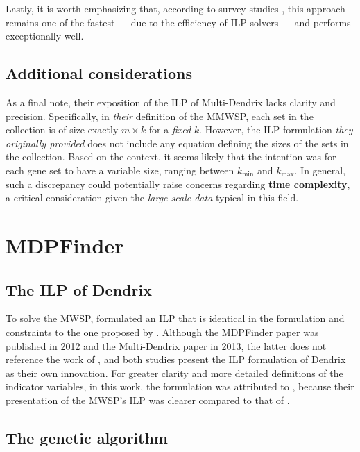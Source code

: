 Lastly, it is worth emphasizing that, according to survey studies \cite{survey}, this approach remains one of the fastest --- due to the efficiency of ILP solvers --- and performs exceptionally well.

\subsection{Additional considerations}

As a final note, their exposition of the ILP of Multi-Dendrix lacks clarity and precision. Specifically, in \textit{their} definition of the MMWSP, each set in the collection is of size exactly $m \times k$ for a \textit{fixed} $k$. However, the ILP formulation \textit{they originally provided} does not include any equation defining the sizes of the sets in the collection. Based on the context, it seems likely that the intention was for each gene set to have a variable size, ranging between $k_\mathrm{min}$ and $k_\mathrm{max}$. In general, such a discrepancy could potentially raise concerns regarding \textbf{time complexity}, a critical consideration given the \textit{large-scale data} typical in this field.

\section{MDPFinder}

\subsection{The ILP of Dendrix}

To solve the MWSP, \textcite{mdpfinder} formulated an ILP that is identical in the formulation and constraints to the one proposed by \textcite{multi-dendrix}. Although the MDPFinder paper was published in 2012 and the Multi-Dendrix paper in 2013, the latter does not reference the work of \textcite{mdpfinder}, and both studies present the ILP formulation of Dendrix as their own innovation. For greater clarity and more detailed definitions of the indicator variables, in this work, the formulation was attributed to \textcite{multi-dendrix}, because their presentation of the MWSP's ILP was clearer compared to that of \textcite{mdpfinder}.

\subsection{The genetic algorithm}

